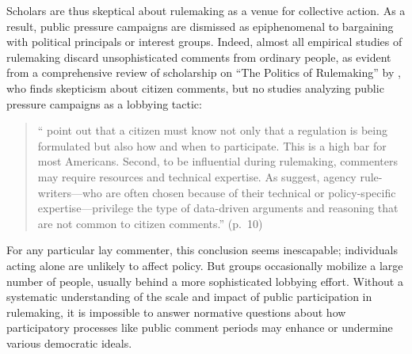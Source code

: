 \documentclass[
      12pt,
        ]{article}
\begin{document}
Scholars are thus skeptical about rulemaking as a venue for collective action. As a result, public pressure campaigns are dismissed as epiphenomenal to bargaining with political principals
or interest groups. Indeed, almost all empirical studies of rulemaking
discard unsophisticated comments from ordinary people, as evident from a
comprehensive review of scholarship on ``The Politics of Rulemaking'' by
\citet{Yackee2019}, who finds skepticism about citizen comments, but no studies
analyzing public pressure campaigns as a lobbying tactic:

\begin{quote}
``\citet{Kerwin2011} point out that a citizen must know not only that a regulation is being formulated but also how and when to participate. This is a high bar for most Americans. Second, to be influential during rulemaking, commenters may require resources and technical expertise. As \citet{Epstein2014} suggest, agency rule-writers---who are often chosen because of their technical or policy-specific expertise---privilege the type of data-driven arguments and reasoning
that are not common to citizen comments.'' (p.~10)
\end{quote}

For any particular lay commenter, this conclusion seems inescapable; individuals acting alone are unlikely to affect policy. But groups occasionally mobilize a large number of people, usually behind a more sophisticated lobbying effort. Without a systematic understanding of the scale and impact of public participation in rulemaking, it is impossible to answer normative questions about how participatory processes like public comment periods may enhance or undermine various democratic ideals.
\end{document}
